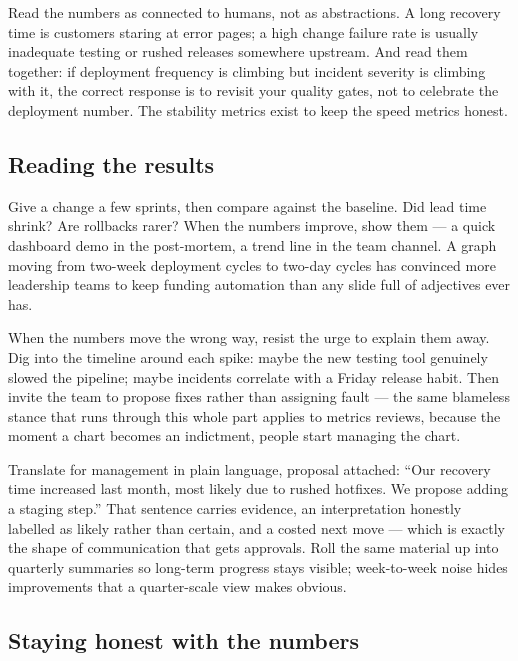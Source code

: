 Read the numbers as connected to humans, not as abstractions. A long recovery time is customers staring at error pages; a high change failure rate is usually inadequate testing or rushed releases somewhere upstream. And read them together: if deployment frequency is climbing but incident severity is climbing with it, the correct response is to revisit your quality gates, not to celebrate the deployment number. The stability metrics exist to keep the speed metrics honest.



\subsection{Reading the results}


Give a change a few sprints, then compare against the baseline. Did lead time shrink? Are rollbacks rarer? When the numbers improve, show them — a quick dashboard demo in the post-mortem, a trend line in the team channel. A graph moving from two-week deployment cycles to two-day cycles has convinced more leadership teams to keep funding automation than any slide full of adjectives ever has.


When the numbers move the wrong way, resist the urge to explain them away. Dig into the timeline around each spike: maybe the new testing tool genuinely slowed the pipeline; maybe incidents correlate with a Friday release habit. Then invite the team to propose fixes rather than assigning fault — the same blameless stance that runs through this whole part applies to metrics reviews, because the moment a chart becomes an indictment, people start managing the chart.


Translate for management in plain language, proposal attached: ``Our recovery time increased last month, most likely due to rushed hotfixes. We propose adding a staging step.'' That sentence carries evidence, an interpretation honestly labelled as likely rather than certain, and a costed next move — which is exactly the shape of communication that gets approvals. Roll the same material up into quarterly summaries so long-term progress stays visible; week-to-week noise hides improvements that a quarter-scale view makes obvious.



\subsection{Staying honest with the numbers}


